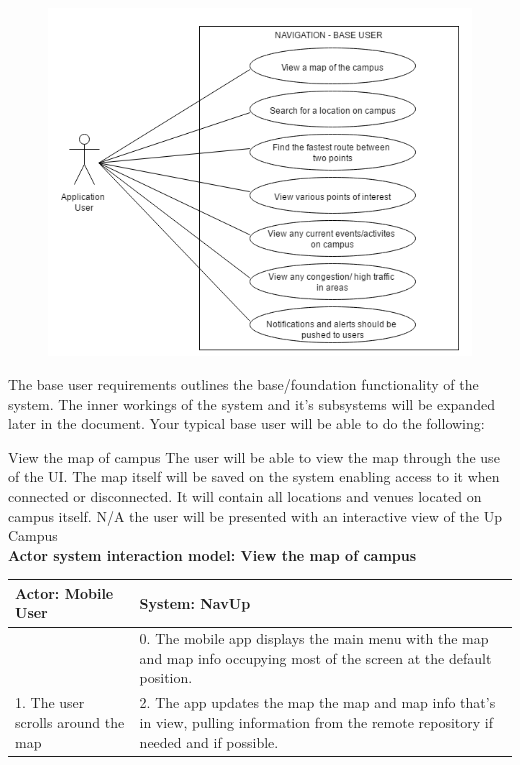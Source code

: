 \begin{figure} 
  \includegraphics[width=\textwidth]{diagrams/Specific_Requirements/base_user_use_case.png}
\end{figure}
The base user requirements outlines the base/foundation functionality of the system. The inner workings of the system and it's subsystems will be expanded later in the document. Your typical base user will be able to do the following:
\\
\bigskip

\FuncReq
{View the map of campus}
{The user will be able to view the map through the use of the UI. The map itself will be saved on the system enabling access to it when connected or disconnected. It will contain all locations and venues located on campus itself.}
{N/A}
{the user will be presented with an interactive view of the Up Campus}
    \\
    \textbf{Actor system interaction model: View the map of campus }\\
    \begin{tabular}{ | p{6cm} | p{6cm} |}
    \hline
    Actor: Mobile User & System: NavUp \\ \hline
     & 0. The mobile app displays the main menu with the map and map info occupying most of the screen at the default position.\\ \hline
    1. The user scrolls around the map & 2. The app updates the map the map and map info that's in view, pulling information from the remote repository if needed and if possible.\\ \hline
    
    \end{tabular}
\\
\bigskip

